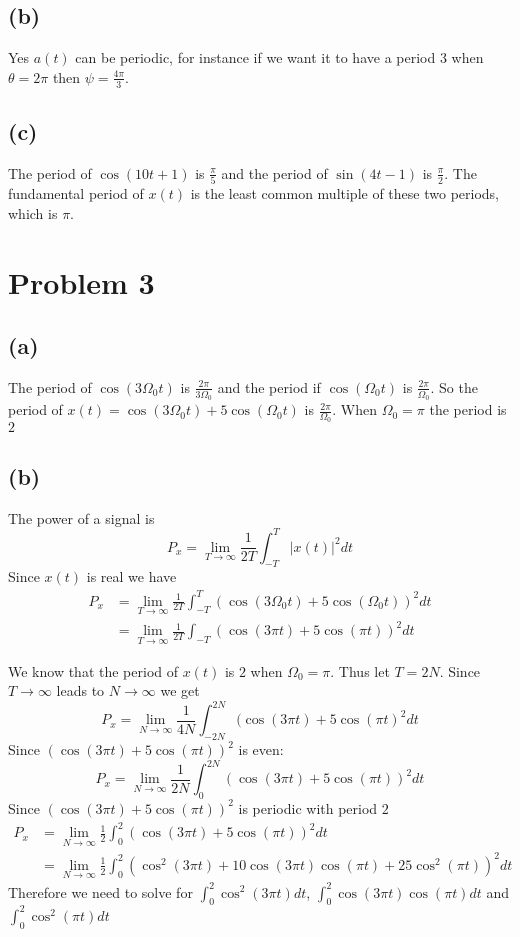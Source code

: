 \documentclass[12pt]{article}
\begin{document}
\subsection*{(b)}
Yes $a(t)$ can be periodic, for instance if we want it to have a period $3$ when $\theta=2\pi$ then $\psi=\frac{4\pi}{3}$.
\subsection*{(c)}
The period of $\cos(10t+1)$ is $\frac{\pi}{5}$ and the period of $\sin(4t-1)$ is $\frac{\pi}{2}$. The fundamental period of $x(t)$ is the least common multiple of these two periods, which is $\boxed{\pi}$.
\section*{Problem 3}
\subsection*{(a)}
The period of $\cos(3\Omega_0 t)$ is $\frac{2\pi}{3\Omega_0}$ and the period if $\cos(\Omega_0 t)$ is $\frac{2\pi}{\Omega_0}$. So the period of $x(t)=\cos(3\Omega_0 t)+5\cos(\Omega_0 t)$ is $\frac{2\pi}{\Omega_0}$. When $\Omega_0=\pi$ the period is $\boxed{2}$
\subsection*{(b)}
The power of a signal is 
$$P_x=\lim_{T\to\infty}\frac{1}{2T}\int_{-T}^{T}|x(t)|^2 dt$$
Since $x(t)$ is real we have
\begin{align*}
P_x&=\lim_{T\to\infty}\frac{1}{2T}\int_{-T}^{T} \left(\cos(3\Omega_0 t)+5\cos(\Omega_0 t)\right)^2dt\\
&=\lim_{T\to\infty}\frac{1}{2T}\int_{-T}\left(\cos(3\pi t)+5\cos(\pi t)\right)^2dt
\end{align*}

We know that the period of $x(t)$ is $2$ when $\Omega_0=\pi$. Thus let $T=2N$. Since $T\to\infty$ leads to $N\to\infty$ we get
$$
P_x=\lim_{N\to\infty}\frac{1}{4N}\int_{-2N}^{2N}(\cos(3\pi t)+5\cos(\pi t)^2dt
$$
Since $\left(\cos(3\pi t)+5\cos(\pi t)\right)^2$ is even:
$$P_x=\lim_{N\to\infty}\frac{1}{2N}\int_{0}^{2N}\left(\cos(3\pi t)+5\cos(\pi t)\right)^2dt$$
Since $\left(\cos(3\pi t)+5\cos(\pi t)\right)^2$ is periodic with period $2$
\begin{align*}
P_x&=\lim_{N\to\infty}\frac{1}{2}\int_{0}^{2}\left(\cos(3\pi t)+5\cos(\pi t)\right)^2dt\\
&=\lim_{N\to\infty}\frac{1}{2}\int_{0}^{2}\left(\cos^2(3\pi t)+10\cos(3\pi t)\cos(\pi t)+25\cos^2(\pi t)\right)^2dt
\end{align*}
Therefore we need to solve for $\int_{0}^{2}\cos^2(3\pi t)dt$, $\int_{0}^{2}\cos(3\pi t)\cos(\pi t)dt$ and $\int_{0}^{2}\cos^2(\pi t) dt$
\end{document}
